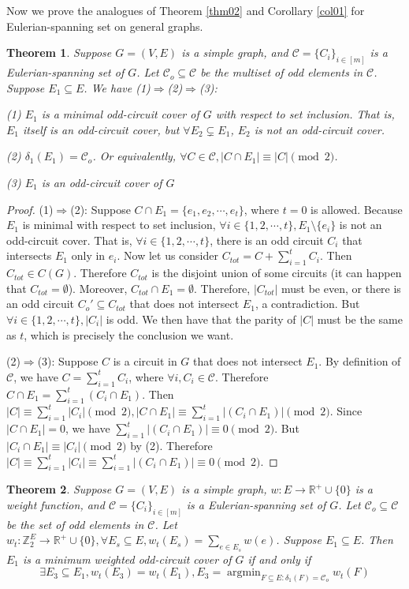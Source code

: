 \documentclass[10pt,fleqn]{article}
\newtheorem{theorem}{Theorem}[section]
\newcommand{\R}{\mathbb{R}}
\newcommand{\Z}{\mathbb{Z}}
\newcommand{\rs}{\setminus}
\newcommand{\mc}[1]{\mathcal{#1}}
\newcommand{\imp}{\Rightarrow}
\newcommand{\argmin}{\operatorname{argmin}}
\begin{document}
	Now we prove the analogues of Theorem \ref{thm02} and Corollary \ref{col01} for Eulerian-spanning set on general graphs.
	\begin{theorem}\label{thm32}
		Suppose $G=(V,E)$ is a simple graph, and $\mc{C}=\{C_i\}_{i\in[m]}$ is a Eulerian-spanning set of $G$. Let $\mc{C}_o\subseteq\mc{C}$ be the multiset of odd elements in $\mc{C}$. Suppose $E_1\subseteq E$. We have (1)$\imp$(2)$\imp$(3):\par
		(1) $E_1$ is a minimal odd-circuit cover of $G$ with respect to set inclusion. That is, $E_1$ itself is an odd-circuit cover, but $\forall E_2\subsetneq E_1$, $E_2$ is not an odd-circuit cover. \par
		(2) $\delta_1(E_1) = \mc{C}_o$. Or equivalently, $\forall C\in \mathcal{C},|C\cap E_1|\equiv|C|\pmod{2}$. \par
		(3) $E_1$ is an odd-circuit cover of $G$
	\end{theorem}
	\begin{proof}
		(1)$\imp$(2): Suppose $C\cap E_1=
		\{e_1,e_2,\cdots,e_t\}$, where $t=0$ is allowed. Because $E_1$ is minimal with respect to set inclusion, $\forall i\in\{1,2,\cdots,t\},E_1\rs\{e_i\}$ is not an odd-circuit cover. That is, $\forall i\in\{1,2,\cdots,t\}$, there is an odd circuit $C_i$ that intersects $E_1$ only in $e_i$. Now let us consider $C_{tot}=C+\sum_{i=1}^tC_i$. Then $C_{tot}\in C(G)$. Therefore $C_{tot}$ is the disjoint union of some circuits (it can happen that $C_{tot}=\emptyset$). Moreover, $C_{tot}\cap E_1=\emptyset$. Therefore, $|C_{tot}|$ must be even, or there is an odd circuit $C_o'\subseteq C_{tot}$ that does not intersect $E_1$, a contradiction. But $\forall i\in\{1,2,\cdots,t\},|C_i|$ is odd. We then have that the parity of $|C|$ must be the same as $t$, which is precisely the conclusion we want. \par
		(2)$\imp$(3): Suppose $C$ is a circuit in $G$ that does not intersect $E_1$. By definition of $\mathcal{C}$, we have $C=\sum_{i=1}^tC_i$, where $\forall i,C_i\in\mc{C}$. Therefore $C\cap E_1=\sum_{i=1}^t(C_i\cap E_1)$. Then $|C|\equiv\sum_{i=1}^t|C_i|\pmod{2},|C\cap E_1|\equiv\sum_{i=1}^t|(C_i\cap E_1)|\pmod{2}$. Since $|C\cap E_1| = 0$, we have $\sum_{i=1}^t|(C_i\cap E_1)|\equiv 0\pmod{2}$. But $|C_i\cap E_1|\equiv|C_i|\pmod{2}$ by (2). Therefore $|C|\equiv\sum_{i=1}^t|C_i|\equiv\sum_{i=1}^t|(C_i\cap E_1)|\equiv 0\pmod{2}$.
	\end{proof} \par
	\begin{theorem}\label{thm33}
		Suppose $G=(V,E)$ is a simple graph, $w:E\to \R^+\cup\{0\}$ is a weight function, and $\mc{C}=\{C_i\}_{i\in[m]}$ is a Eulerian-spanning set of $G$. Let $\mc{C}_o\subseteq\mc{C}$ be the set of odd elements in $\mc{C}$. Let $w_{t}:\Z_2^{E}\to\R^+\cup\{0\},\forall E_s\subseteq E,w_t(E_s)=\sum_{e\in E_s}w(e)$. Suppose $E_1\subseteq E$. Then $E_1$ is a minimum weighted odd-circuit cover of $G$ if and only if 
		$$\exists E_3\subseteq E_1,w_t(E_3)=w_t(E_1),E_3=\argmin_{F\subseteq E:\delta_1(F)=\mc{C}_o}w_t(F)$$
	\end{theorem}
\end{document}
